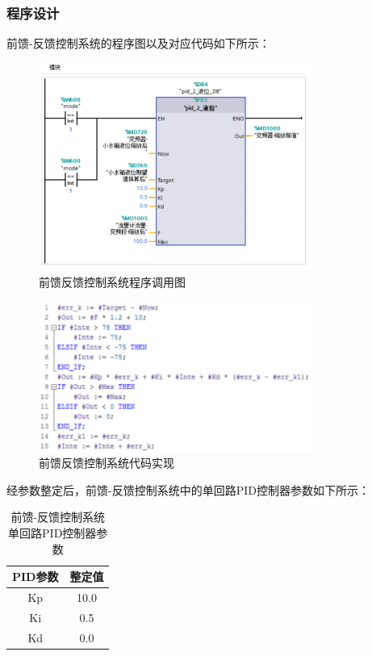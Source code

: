 \documentclass[UTF8]{article}
\begin{document}
\subsubsection{程序设计}
前馈-反馈控制系统的程序图以及对应代码如下所示：
\begin{figure}[H]
    \centering %
    \includegraphics[width=0.8\textwidth]{figure/前馈反馈-程序1.png} 
    \caption{前馈反馈控制系统程序调用图} %
\end{figure}
\begin{figure}[H]
    \centering %
    \includegraphics[width=0.8\textwidth]{figure/前馈反馈-程序2.png} 
    \caption{前馈反馈控制系统代码实现} %
\end{figure}

经参数整定后，前馈-反馈控制系统中的单回路PID控制器参数如下所示：
\begin{table}[H] %
\centering %
\begin{tabular}{cc} %
	\toprule %
	PID参数 & 整定值 \\
	\midrule %
	Kp &  10.0 \\
	Ki & 0.5 \\
	Kd & 0.0 \\
	\bottomrule %
\end{tabular}
\caption{前馈-反馈控制系统单回路PID控制器参数} %
\end{table}
\end{document}
